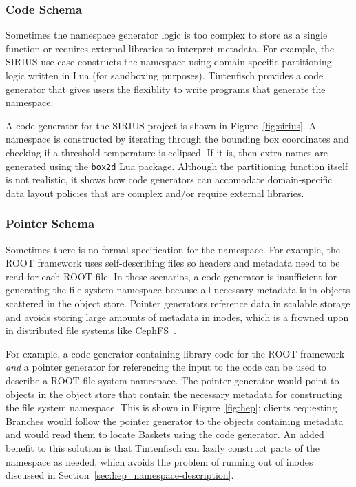 
\subsubsection{Code Schema}

Sometimes the namespace generator logic is too complex to store as a single
function or requires external libraries to interpret metadata. For example, the
SIRIUS use case constructs the namespace using domain-specific partitioning
logic written in Lua (for sandboxing purposes).  Tintenfisch provides a code
generator that gives users the flexiblity to write programs that generate the
namespace.

A code generator for the SIRIUS project is shown in Figure~\ref{fig:sirius}.  A
namespace is constructed by iterating through the bounding box coordinates and
checking if a threshold temperature is eclipsed. If it is, then extra names
are generated using the \texttt{box2d} Lua package.  Although the partitioning
function itself is not realistic, it shows how code generators can accomodate
domain-specific data layout policies that are complex and/or require external
libraries.  

\subsubsection{Pointer Schema} 

Sometimes there is no formal specification for the namespace. For example, the
ROOT framework uses self-describing files so headers and metadata need to be
read for each ROOT file. In these scenarios, a code generator is insufficient for
generating the file system namespace because all necessary metadata is in
objects scattered in the object store. Pointer generators reference data in
scalable storage and avoids storing large amounts of metadata in inodes, which
is a frowned upon in distributed file systems like
CephFS~\cite{docs:cephinternals}.

For example, a code generator containing library code for the ROOT framework
\emph{and} a pointer generator for referencing the input to the code can be
used to describe a ROOT file system namespace. The pointer generator would
point to objects in the object store that contain the necessary metadata for
constructing the file system namespace. This is shown in Figure~\ref{fig:hep};
clients requesting Branches would follow the pointer generator to the objects
containing metadata and would read them to locate Baskets using the code
generator. An added benefit to this solution is that Tintenfisch can lazily
construct parts of the namespace as needed, which avoids the problem of running
out of inodes discussed in Section~\ref{sec:hep_namespace-description}.

